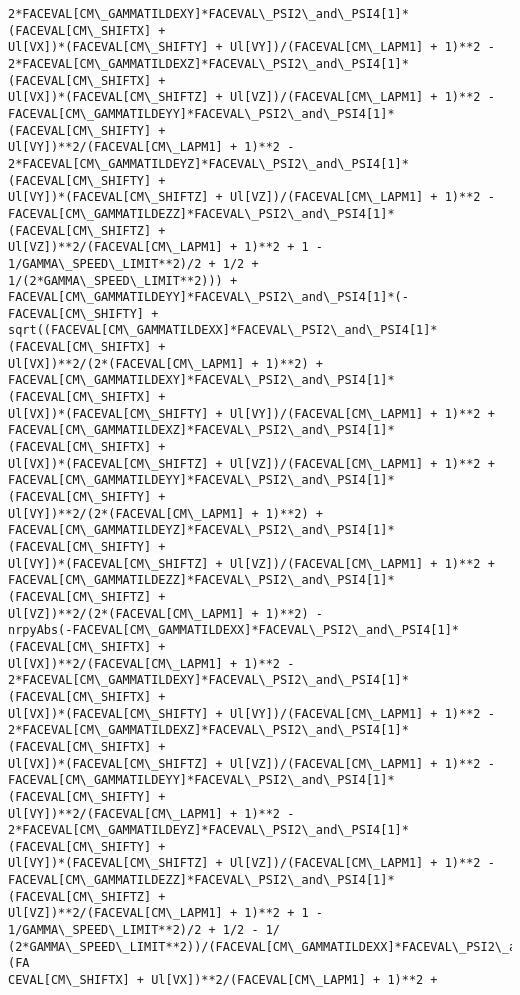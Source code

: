 \documentclass[landscape,letterpaper,10pt,english]{article}
\begin{document}
\begin{Verbatim}[commandchars=\\\{\}]
2*FACEVAL[CM\_GAMMATILDEXY]*FACEVAL\_PSI2\_and\_PSI4[1]*(FACEVAL[CM\_SHIFTX] +
Ul[VX])*(FACEVAL[CM\_SHIFTY] + Ul[VY])/(FACEVAL[CM\_LAPM1] + 1)**2 -
2*FACEVAL[CM\_GAMMATILDEXZ]*FACEVAL\_PSI2\_and\_PSI4[1]*(FACEVAL[CM\_SHIFTX] +
Ul[VX])*(FACEVAL[CM\_SHIFTZ] + Ul[VZ])/(FACEVAL[CM\_LAPM1] + 1)**2 -
FACEVAL[CM\_GAMMATILDEYY]*FACEVAL\_PSI2\_and\_PSI4[1]*(FACEVAL[CM\_SHIFTY] +
Ul[VY])**2/(FACEVAL[CM\_LAPM1] + 1)**2 -
2*FACEVAL[CM\_GAMMATILDEYZ]*FACEVAL\_PSI2\_and\_PSI4[1]*(FACEVAL[CM\_SHIFTY] +
Ul[VY])*(FACEVAL[CM\_SHIFTZ] + Ul[VZ])/(FACEVAL[CM\_LAPM1] + 1)**2 -
FACEVAL[CM\_GAMMATILDEZZ]*FACEVAL\_PSI2\_and\_PSI4[1]*(FACEVAL[CM\_SHIFTZ] +
Ul[VZ])**2/(FACEVAL[CM\_LAPM1] + 1)**2 + 1 - 1/GAMMA\_SPEED\_LIMIT**2)/2 + 1/2 +
1/(2*GAMMA\_SPEED\_LIMIT**2))) +
FACEVAL[CM\_GAMMATILDEYY]*FACEVAL\_PSI2\_and\_PSI4[1]*(-FACEVAL[CM\_SHIFTY] +
sqrt((FACEVAL[CM\_GAMMATILDEXX]*FACEVAL\_PSI2\_and\_PSI4[1]*(FACEVAL[CM\_SHIFTX] +
Ul[VX])**2/(2*(FACEVAL[CM\_LAPM1] + 1)**2) +
FACEVAL[CM\_GAMMATILDEXY]*FACEVAL\_PSI2\_and\_PSI4[1]*(FACEVAL[CM\_SHIFTX] +
Ul[VX])*(FACEVAL[CM\_SHIFTY] + Ul[VY])/(FACEVAL[CM\_LAPM1] + 1)**2 +
FACEVAL[CM\_GAMMATILDEXZ]*FACEVAL\_PSI2\_and\_PSI4[1]*(FACEVAL[CM\_SHIFTX] +
Ul[VX])*(FACEVAL[CM\_SHIFTZ] + Ul[VZ])/(FACEVAL[CM\_LAPM1] + 1)**2 +
FACEVAL[CM\_GAMMATILDEYY]*FACEVAL\_PSI2\_and\_PSI4[1]*(FACEVAL[CM\_SHIFTY] +
Ul[VY])**2/(2*(FACEVAL[CM\_LAPM1] + 1)**2) +
FACEVAL[CM\_GAMMATILDEYZ]*FACEVAL\_PSI2\_and\_PSI4[1]*(FACEVAL[CM\_SHIFTY] +
Ul[VY])*(FACEVAL[CM\_SHIFTZ] + Ul[VZ])/(FACEVAL[CM\_LAPM1] + 1)**2 +
FACEVAL[CM\_GAMMATILDEZZ]*FACEVAL\_PSI2\_and\_PSI4[1]*(FACEVAL[CM\_SHIFTZ] +
Ul[VZ])**2/(2*(FACEVAL[CM\_LAPM1] + 1)**2) -
nrpyAbs(-FACEVAL[CM\_GAMMATILDEXX]*FACEVAL\_PSI2\_and\_PSI4[1]*(FACEVAL[CM\_SHIFTX] +
Ul[VX])**2/(FACEVAL[CM\_LAPM1] + 1)**2 -
2*FACEVAL[CM\_GAMMATILDEXY]*FACEVAL\_PSI2\_and\_PSI4[1]*(FACEVAL[CM\_SHIFTX] +
Ul[VX])*(FACEVAL[CM\_SHIFTY] + Ul[VY])/(FACEVAL[CM\_LAPM1] + 1)**2 -
2*FACEVAL[CM\_GAMMATILDEXZ]*FACEVAL\_PSI2\_and\_PSI4[1]*(FACEVAL[CM\_SHIFTX] +
Ul[VX])*(FACEVAL[CM\_SHIFTZ] + Ul[VZ])/(FACEVAL[CM\_LAPM1] + 1)**2 -
FACEVAL[CM\_GAMMATILDEYY]*FACEVAL\_PSI2\_and\_PSI4[1]*(FACEVAL[CM\_SHIFTY] +
Ul[VY])**2/(FACEVAL[CM\_LAPM1] + 1)**2 -
2*FACEVAL[CM\_GAMMATILDEYZ]*FACEVAL\_PSI2\_and\_PSI4[1]*(FACEVAL[CM\_SHIFTY] +
Ul[VY])*(FACEVAL[CM\_SHIFTZ] + Ul[VZ])/(FACEVAL[CM\_LAPM1] + 1)**2 -
FACEVAL[CM\_GAMMATILDEZZ]*FACEVAL\_PSI2\_and\_PSI4[1]*(FACEVAL[CM\_SHIFTZ] +
Ul[VZ])**2/(FACEVAL[CM\_LAPM1] + 1)**2 + 1 - 1/GAMMA\_SPEED\_LIMIT**2)/2 + 1/2 - 1/
(2*GAMMA\_SPEED\_LIMIT**2))/(FACEVAL[CM\_GAMMATILDEXX]*FACEVAL\_PSI2\_and\_PSI4[1]*(FA
CEVAL[CM\_SHIFTX] + Ul[VX])**2/(FACEVAL[CM\_LAPM1] + 1)**2 +

\end{Verbatim}
\end{document}
